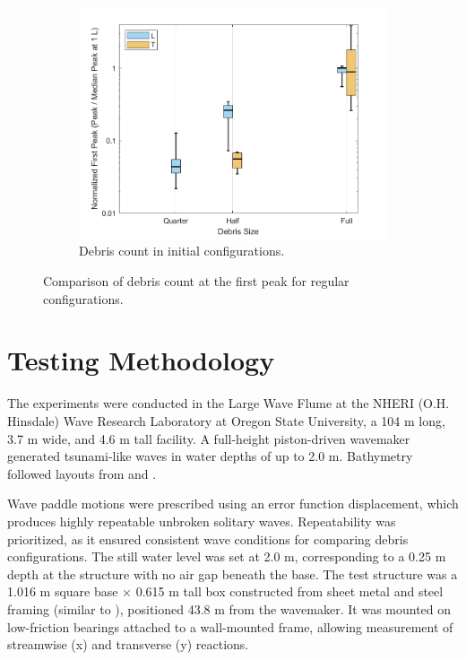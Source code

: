 \documentclass{article}
\begin{document}
\begin{figure}[htbp]
    \centering
    \begin{subfigure}[t]{0.9\textwidth}
        \centering
        \includegraphics[width=\textwidth]{FirstPeak_Regular_SplitByTrial_single.png}
        \caption{Debris count in initial configurations.}
        \label{fig:laterpeak_regular_original}
    \end{subfigure}
    \caption{Comparison of debris count at the first peak for regular configurations.}
    \label{fig:firstpeak_regular}
\end{figure}





\section{Testing Methodology}
The experiments were conducted in the Large Wave Flume at the NHERI (O.H. Hinsdale) Wave Research Laboratory at Oregon State University, a 104 m long, 3.7 m wide, and 4.6 m tall facility. A full-height piston-driven wavemaker generated tsunami-like waves in water depths of up to 2.0 m. Bathymetry followed layouts from \citep{winterTsunamiLikeWaveForces2020} and \citep{Shekhar2020}.

Wave paddle motions were prescribed using an error function displacement, which produces highly repeatable unbroken solitary waves. Repeatability was prioritized, as it ensured consistent wave conditions for comparing debris configurations. The still water level was set at 2.0 m, corresponding to a 0.25 m depth at the structure with no air gap beneath the base. The test structure was a 1.016 m square base × 0.615 m tall box constructed from sheet metal and steel framing (similar to \citep{winterTsunamiLikeWaveForces2020}), positioned 43.8 m from the wavemaker. It was mounted on low-friction bearings attached to a wall-mounted frame, allowing measurement of streamwise (x) and transverse (y) reactions.
\end{document}
